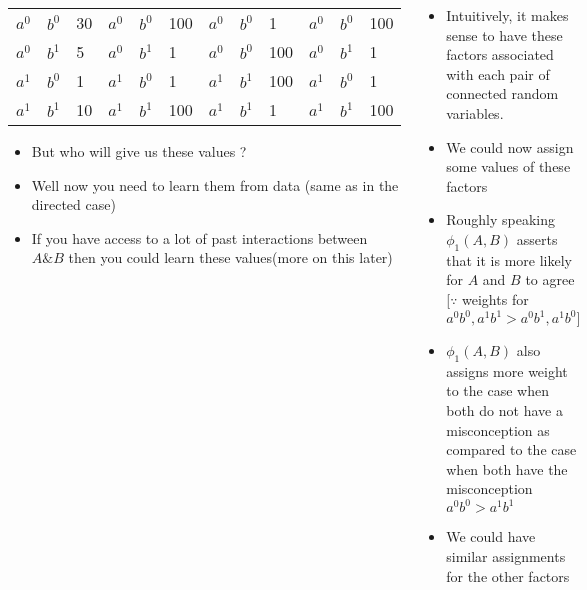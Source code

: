 \begin{frame}
\begin{columns}
\begin{overlayarea}{\textwidth}{\textheight}
\begin{center}
\begin{table}
{{\begin{tabular}{|ccp{1cm}|ccp{1cm}|ccp{1cm}|ccp{1cm}|}
$a^0$       & $b^0$       & 30      & $a^0$       & $b^0$      & 100      & $a^0$      & $b^0$      & 1        & $a^0$      & $b^0$      & 100      \\
$a^0$       & $b^1$       & 5       & $a^0$       & $b^1$      & 1        & $a^0$      & $b^0$      & 100      & $a^0$      & $b^1$      & 1        \\
$a^1$       & $b^0$       & 1       & $a^1$       & $b^0$      & 1        & $a^1$      & $b^1$      & 100      & $a^1$      & $b^0$      & 1        \\
$a^1$       & $b^1$       & 10      & $a^1$       & $b^1$      & 100      & $a^1$      & $b^1$      & 1        & $a^1$      & $b^1$      & 100      \\ \hline
\end{tabular}}
}
\end{table}
\end{center}
\vspace{-0.3in}
\footnotesize
\begin{itemize}\justifying
	\item<3-> But who will give us these values ?
	\item<4-> Well now you need to learn them from data (same as in the directed case)
	\item<5-> If you have access to a lot of past interactions between $A\&B$ then you could learn these values(more on this later)
	\end{itemize}
		\end{overlayarea}
		\begin{overlayarea}{\textwidth}{\textheight}

			\begin{itemize}\justifying
			\item<1-> Intuitively, it makes sense to have these factors associated with each pair of connected random variables.
			\item<2-> We could now assign some values of these factors
			\item<6-> Roughly speaking $\phi_1(A, B)$ asserts that it is more likely for $A$ and $B$ to agree [$\because$ weights for $a^0 b^0, a^1 b^1 > a^0b^1,a^1b^0]$
			\item <7-> $\phi_1(A,B)$ also assigns more weight to the case when both do not have a misconception as compared to the case when both have the misconception $a^0 b^0 > a^1b^1$
			\item<8-> We could have similar assignments for the other factors
			\end{itemize}
		\end{overlayarea}
	\end{columns}
\end{frame}



